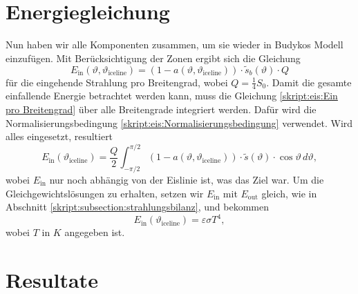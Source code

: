 \begin{refsection}
\section{Energiegleichung}
Nun haben wir alle Komponenten zusammen, um sie wieder in Budykos Modell einzufügen. Mit Berücksichtigung der Zonen ergibt sich die Gleichung
\begin{equation}\label{skript:eis:Ein pro Breitengrad}
E_\text{in}(\vartheta,\vartheta_\text{iceline})
=
(1-a(\vartheta,\vartheta_\text{iceline}))\cdot\tilde{s}_{b}(\vartheta)\cdot Q
\end{equation}
für die eingehende Strahlung pro Breitengrad, wobei $Q=\tfrac{1}{4}S_{0}$. Damit die gesamte einfallende Energie betrachtet werden kann, muss die Gleichung \eqref{skript:eis:Ein pro Breitengrad} über alle Breitengrade integriert werden. Dafür wird die Normalisierungsbedingung \eqref{skript:eis:Normalisierungsbedingung} verwendet. Wird alles eingesetzt, resultiert
\begin{equation}\label{skript:eis:Ein abh ice line}
E_\text{in}(\vartheta_\text{iceline})
=
\frac{Q}{2}\int_{-\pi/2}^{\pi/2}(1-a(\vartheta,\vartheta_\text{iceline}))\cdot\tilde{s}(\vartheta)\cdot\cos\vartheta\,d\vartheta,
\end{equation}
wobei $E_\text{in}$ nur noch abhängig von der Eislinie ist, was das Ziel war.
Um die Gleichgewichtslösungen zu erhalten, setzen wir $E_\text{in}$ mit $E_\text{out}$ gleich, wie in Abschnitt \ref{skript:subsection:strahlungsbilanz}, und bekommen
\begin{equation}\label{skript:eis:Gleichgewichtsgleichung}
	E_\text{in}(\vartheta_\text{iceline})
	=
	\varepsilon\sigma T^4,
\end{equation}
wobei $T$ in $K$ angegeben ist.
\section{Resultate} \label{skript:eis:Resultate}

\end{refsection}

